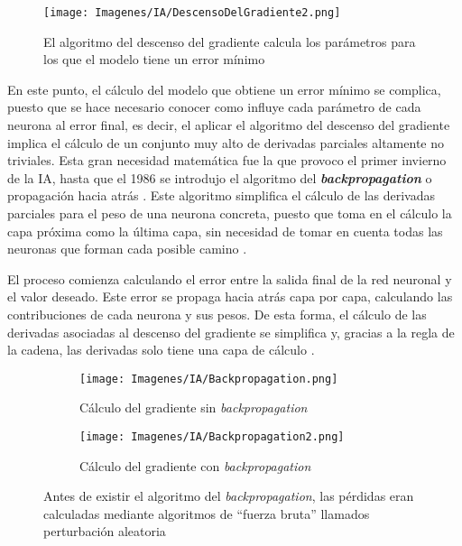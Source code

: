 \documentclass{report}
\begin{document}
\vspace{0.4cm}
\begin{figure}[H]
    \centering
    \texttt{[image: Imagenes/IA/DescensoDelGradiente2.png]}
    \caption{El algoritmo del descenso del gradiente calcula los parámetros para los que el modelo tiene un error mínimo \cite{VideoCSVRedeNeuronales2}}
    \label{fig:DescGrad}
\end{figure}
\vspace{0.4cm}


En este punto, el cálculo del modelo que obtiene un error mínimo se complica, puesto que se hace necesario conocer como influye cada parámetro de cada neurona al error final, es decir, el aplicar el algoritmo del descenso del gradiente implica el cálculo de un conjunto muy alto de derivadas parciales altamente no triviales. Esta gran necesidad matemática fue la que provoco el primer invierno de la IA, hasta que el 1986 se introdujo el algoritmo del \textit{\textbf{backpropagation}} o propagación hacia atrás \cite{LibroFinInvierno}. Este algoritmo simplifica el cálculo de las derivadas parciales para el peso de una neurona concreta, puesto que toma en el cálculo la capa próxima como la última capa, sin necesidad de tomar en cuenta todas las neuronas que forman cada posible camino \cite{VideoCSVBackPropagation}. 

El proceso comienza calculando el error entre la salida final de la red neuronal y el valor deseado. Este error se propaga hacia atrás capa por capa, calculando las contribuciones de cada neurona y sus pesos. De esta forma, el cálculo de las derivadas asociadas al descenso del gradiente se simplifica y, gracias a la regla de la cadena, las derivadas solo tiene una capa de cálculo \cite{ArticuloBackpropagationReglaCdena}. 



\vspace{0.4cm}
\begin{figure}[hbpt]
	 	\centering
	 	\begin{subfigure}[b]{0.45\linewidth}
	 	\centering
	 		\texttt{[image: Imagenes/IA/Backpropagation.png]}
                    \caption{Cálculo del gradiente sin \textit{backpropagation}}
                    \label{fig:Backpropagation1}
	 	\end{subfigure}
	 	\centering
	 	\begin{subfigure}[b]{0.45\linewidth}
	 	\centering
	 		\texttt{[image: Imagenes/IA/Backpropagation2.png]}
                    \caption{Cálculo del gradiente con \textit{backpropagation}}
                    \label{fig:Backpropagation2}
	 	\end{subfigure}
   \caption{Antes de existir el algoritmo del \textit{backpropagation}, las pérdidas eran calculadas mediante algoritmos
   de ``fuerza bruta'' llamados perturbación aleatoria \cite{VideoCSVBackPropagation} }
    \label{fig:Backpropagation}
\end{figure}
\end{document}
